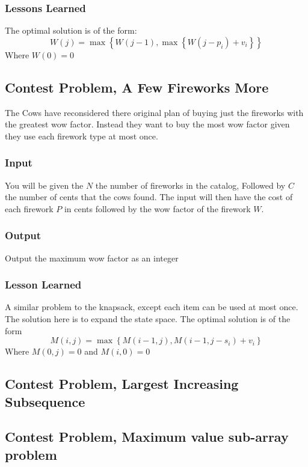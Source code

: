 

\subsubsection{Lessons Learned}
The optimal solution is of the form:
$$W(j) = \max \left\{W(j-1), \max \left\{W(j - p_i) + v_i \right\}\right\}$$
Where $W(0) = 0$

\subsection{Contest Problem, A Few Fireworks More}
The Cows have reconsidered there original plan of buying just the fireworks with the greatest wow factor.
Instead they want to buy the most wow factor given they use each firework type at most once.

\subsubsection{Input}
You will be given the $N$ the number of fireworks in the catalog,
Followed by $C$ the number of cents that the cows found.
The input will then have the cost of each firework $P$ in cents followed by the wow factor of the firework $W$.

\subsubsection{Output}
Output the maximum wow factor as an integer

\subsubsection{Lesson Learned}
A similar problem to the knapsack, except each item can be used at most once.  The solution here is to expand the state space.  The optimal solution is of the form
$$M(i,j) = \max \left\{ M(i-1, j) , M(i-1, j- s_i) + v_i \right\}$$
Where $M(0,j) = 0$ and $M(i,0) = 0$


\subsection{Contest Problem, Largest Increasing Subsequence}
\subsection{Contest Problem, Maximum value sub-array problem}
